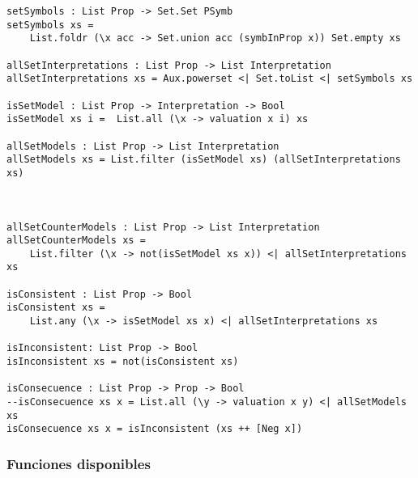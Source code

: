 \documentclass[a4paper]{report}
\begin{document}
\begin{lstlisting}[caption={Módulo SintaxSemanticsLP}]
setSymbols : List Prop -> Set.Set PSymb
setSymbols xs = 
    List.foldr (\x acc -> Set.union acc (symbInProp x)) Set.empty xs

allSetInterpretations : List Prop -> List Interpretation
allSetInterpretations xs = Aux.powerset <| Set.toList <| setSymbols xs

isSetModel : List Prop -> Interpretation -> Bool
isSetModel xs i =  List.all (\x -> valuation x i) xs

allSetModels : List Prop -> List Interpretation
allSetModels xs = List.filter (isSetModel xs) (allSetInterpretations xs)



allSetCounterModels : List Prop -> List Interpretation
allSetCounterModels xs = 
    List.filter (\x -> not(isSetModel xs x)) <| allSetInterpretations xs

isConsistent : List Prop -> Bool
isConsistent xs = 
    List.any (\x -> isSetModel xs x) <| allSetInterpretations xs

isInconsistent: List Prop -> Bool
isInconsistent xs = not(isConsistent xs)

isConsecuence : List Prop -> Prop -> Bool
--isConsecuence xs x = List.all (\y -> valuation x y) <| allSetModels xs
isConsecuence xs x = isInconsistent (xs ++ [Neg x])
\end{lstlisting}


\subsubsection{Funciones disponibles}
\end{document}
